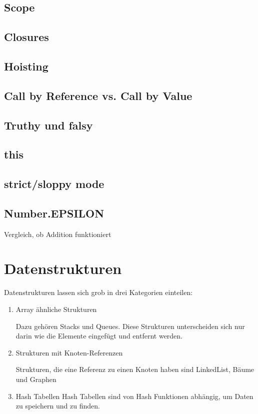 \documentclass[babel]{book}
\begin{document}
\section{Scope}
\section{Closures}
\section{Hoisting}
\section{Call by Reference vs. Call by Value}
\section{Truthy und falsy}
\section{this}
\section{strict/sloppy mode}
\section{Number.EPSILON}
Vergleich, ob Addition funktioniert

\chapter{Datenstrukturen}
Datenstrukturen lassen sich grob in drei Kategorien einteilen:
\begin{enumerate} 
	\item Array ähnliche Strukturen
	
	Dazu gehören Stacks und Queues. Diese Strukturen unterscheiden sich nur darin wie die Elemente eingefügt und entfernt werden.
	\item Strukturen mit Knoten-Referenzen
	
	Strukturen, die eine Referenz zu einen Knoten haben sind LinkedList, Bäume und Graphen
	
	\item Hash Tabellen
	Hash Tabellen sind von Hash Funktionen abhängig, um Daten zu speichern und zu finden.
	
\end{enumerate}
\end{document}
